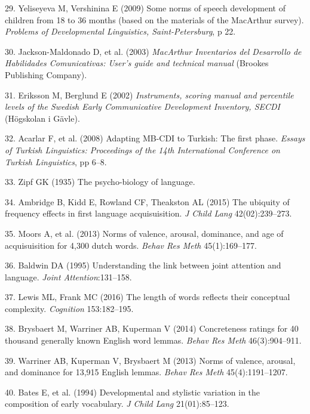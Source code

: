 \documentclass[english,man]{apa6}
\theoremstyle{definition}
\theoremstyle{definition}
\theoremstyle{definition}
\theoremstyle{remark}
\begin{document}
\hypertarget{ref-yeliseyeva2009}{}
29. Yeliseyeva M, Vershinina E (2009) Some norms of speech development
of children from 18 to 36 months (based on the materials of the
MacArthur survey). \emph{Problems of Developmental Linguistics,
Saint-Petersburg}, p 22.

\hypertarget{ref-fenson2003}{}
30. Jackson-Maldonado D, et al. (2003) \emph{MacArthur Inventarios del
Desarrollo de Habilidades Comunicativas: User's guide and technical
manual} (Brookes Publishing Company).

\hypertarget{ref-eriksson2002}{}
31. Eriksson M, Berglund E (2002) \emph{Instruments, scoring manual and
percentile levels of the Swedish Early Communicative Development
Inventory, SECDI} (Högskolan i Gävle).

\hypertarget{ref-acarlar2008}{}
32. Acarlar F, et al. (2008) Adapting MB-CDI to Turkish: The first
phase. \emph{Essays of Turkish Linguistics: Proceedings of the 14th
International Conference on Turkish Linguistics}, pp 6--8.

\hypertarget{ref-zipf1935}{}
33. Zipf GK (1935) The psycho-biology of language.

\hypertarget{ref-ambridge2015}{}
34. Ambridge B, Kidd E, Rowland CF, Theakston AL (2015) The ubiquity of
frequency effects in first language acquisuisition. \emph{J Child Lang}
42(02):239--273.

\hypertarget{ref-moors2013}{}
35. Moors A, et al. (2013) Norms of valence, arousal, dominance, and age
of acquisuisition for 4,300 dutch words. \emph{Behav Res Meth}
45(1):169--177.

\hypertarget{ref-baldwin1995}{}
36. Baldwin DA (1995) Understanding the link between joint attention and
language. \emph{Joint Attention}:131--158.

\hypertarget{ref-lewis2016}{}
37. Lewis ML, Frank MC (2016) The length of words reflects their
conceptual complexity. \emph{Cognition} 153:182--195.

\hypertarget{ref-brysbaert2014}{}
38. Brysbaert M, Warriner AB, Kuperman V (2014) Concreteness ratings for
40 thousand generally known English word lemmas. \emph{Behav Res Meth}
46(3):904--911.

\hypertarget{ref-warriner2013}{}
39. Warriner AB, Kuperman V, Brysbaert M (2013) Norms of valence,
arousal, and dominance for 13,915 English lemmas. \emph{Behav Res Meth}
45(4):1191--1207.

\hypertarget{ref-bates1994}{}
40. Bates E, et al. (1994) Developmental and stylistic variation in the
composition of early vocabulary. \emph{J Child Lang} 21(01):85--123.
\end{document}
